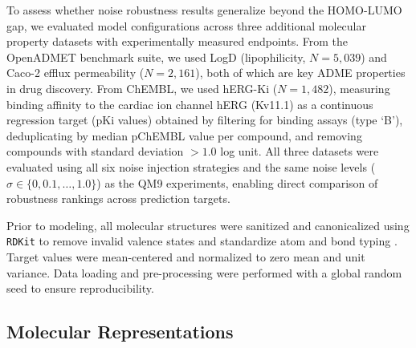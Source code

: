 \documentclass[pdflatex,sn-mathphys-num]{sn-jnl}%
\theoremstyle{thmstyleone}%
\theoremstyle{thmstyletwo}%
\theoremstyle{thmstylethree}%
\begin{document}
To assess whether noise robustness results generalize beyond the HOMO-LUMO gap, we evaluated model configurations across three additional molecular property datasets with experimentally measured endpoints. From the OpenADMET benchmark suite, we used LogD (lipophilicity, $N = 5{,}039$) and Caco-2 efflux permeability ($N = 2{,}161$), both of which are key ADME properties in drug discovery. From ChEMBL, we used hERG-Ki ($N = 1{,}482$), measuring binding affinity to the cardiac ion channel hERG (Kv11.1) as a continuous regression target (pKi values) obtained by filtering for binding assays (type `B'), deduplicating by median pChEMBL value per compound, and removing compounds with standard deviation $> 1.0$ log unit. All three datasets were evaluated using all six noise injection strategies and the same noise levels ($\sigma \in \{0, 0.1, \ldots, 1.0\}$) as the QM9 experiments, enabling direct comparison of robustness rankings across prediction targets.

Prior to modeling, all molecular structures were sanitized and canonicalized using \texttt{RDKit} to remove invalid valence states and standardize atom and bond typing \citep{rdkit}. Target values were mean-centered and normalized to zero mean and unit variance. Data loading and pre-processing were performed with a global random seed to ensure reproducibility.

\subsection{Molecular Representations}
\end{document}
